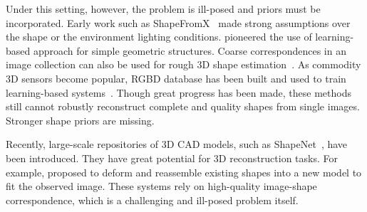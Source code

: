 \documentclass[10pt,twocolumn,letterpaper]{article}
\begin{document}
Under this setting, however, the problem is ill-posed and priors must be incorporated. Early work such as ShapeFromX~\cite{horn1989obtaining,aloimonos1988shape} made strong assumptions over the shape or the environment lighting conditions. \cite{hoiem2005automatic,saxena2009make3d} pioneered the use of learning-based approach for simple geometric structures. Coarse correspondences in an image collection can also be used for rough 3D shape estimation~\cite{shapesKarTCM15,carreira2016lifting}. As commodity 3D sensors become popular, RGBD database has been built and used to train learning-based systems~\cite{eigen2014depth,Fouhey13}. Though great progress has been made, these methods still cannot robustly reconstruct complete and quality shapes from single images. Stronger shape priors are missing.

Recently, large-scale repositories of 3D CAD models, such as ShapeNet~\cite{shapenet2015}, have been introduced. They have great potential for 3D reconstruction tasks. For example, \cite{su2014estimating,huang2015single} proposed to deform and reassemble existing shapes into a new model to fit the observed image. These systems rely on high-quality image-shape correspondence, which is a challenging and ill-posed problem itself.
\end{document}
